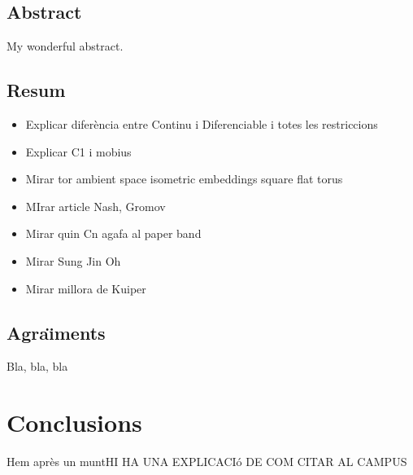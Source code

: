 \documentclass[11pt,a4paper,openright,oneside]{book}
\numberwithin{equation}{section}
\theoremstyle{definition}
\begin{document}
\newpage
{} 

\section*{Abstract}
My wonderful abstract.

\section*{Resum}
\begin{itemize}
    \item Explicar diferència entre Continu i Diferenciable i totes les restriccions
    \item Explicar C1 i mobius
    \item Mirar tor ambient space isometric embeddings square flat torus
    \item MIrar article Nash, Gromov
    \item Mirar quin Cn agafa al paper band
    \item Mirar Sung Jin Oh
    \item Mirar millora de Kuiper
\end{itemize}

\newpage 


\section*{Agra\"{\i}ments}

Bla, bla, bla
\newpage

\tableofcontents

\newpage










\chapter{Conclusions}

Hem après un muntHI HA UNA EXPLICACIó DE COM CITAR AL CAMPUS

\normalfont

\newpage
\end{document}
